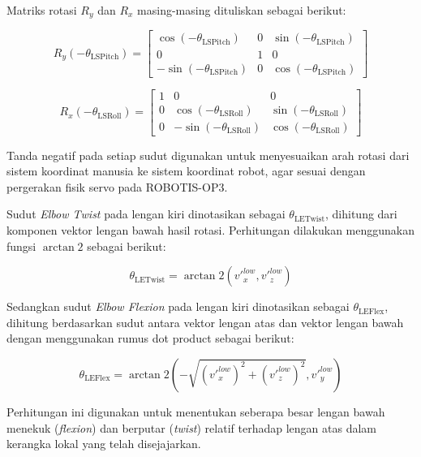 Matriks rotasi $R_y$ dan $R_x$ masing-masing dituliskan sebagai berikut:

\begin{equation}
R_y(-\theta_{\text{LSPitch}}) = 
\begin{bmatrix}
\cos(-\theta_{\text{LSPitch}}) & 0 & \sin(-\theta_{\text{LSPitch}}) \\
0 & 1 & 0 \\
-\sin(-\theta_{\text{LSPitch}}) & 0 & \cos(-\theta_{\text{LSPitch}})
\end{bmatrix}
\end{equation}

\begin{equation}
R_x(-\theta_{\text{LSRoll}}) = 
\begin{bmatrix}
1 & 0 & 0 \\
0 & \cos(-\theta_{\text{LSRoll}}) & \sin(-\theta_{\text{LSRoll}}) \\
0 & -\sin(-\theta_{\text{LSRoll}}) & \cos(-\theta_{\text{LSRoll}})
\end{bmatrix}
\end{equation}

Tanda negatif pada setiap sudut digunakan untuk menyesuaikan arah rotasi dari sistem koordinat manusia ke sistem koordinat robot, agar sesuai dengan pergerakan fisik servo pada ROBOTIS-OP3.

Sudut \textit{Elbow Twist} pada lengan kiri dinotasikan sebagai $\theta_{\text{LETwist}}$, dihitung dari komponen vektor lengan bawah hasil rotasi. Perhitungan dilakukan menggunakan fungsi $\arctan2$ sebagai berikut:

\begin{equation}
\theta_{\text{LETwist}} = \arctan2\left(v'^{low}_x,v'^{low}_z\right)
\end{equation}

Sedangkan sudut \textit{Elbow Flexion} pada lengan kiri dinotasikan sebagai $\theta_{\text{LEFlex}}$, dihitung berdasarkan sudut antara vektor lengan atas dan vektor lengan bawah dengan menggunakan rumus dot product sebagai berikut:

\begin{equation}
\theta_{\text{LEFlex}} = \arctan2\left(-\sqrt{(v'^{low}_x)^2 + (v'^{low}_z)^2},v'^{low}_y\right)
\end{equation}

Perhitungan ini digunakan untuk menentukan seberapa besar lengan bawah menekuk (\textit{flexion}) dan berputar (\textit{twist}) relatif terhadap lengan atas dalam kerangka lokal yang telah disejajarkan.


